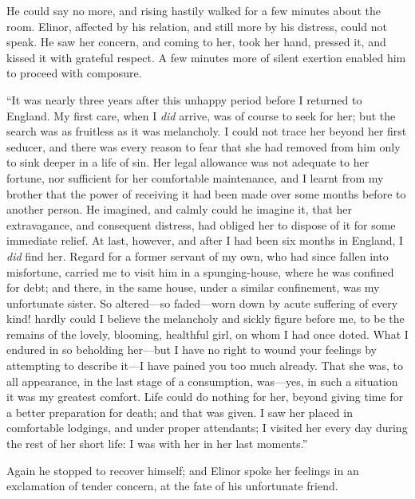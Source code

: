 He could say no more, and rising hastily walked for a few minutes about the room. Elinor, affected by his relation, and still more by his distress, could not speak. He saw her concern, and coming to her, took her hand, pressed it, and kissed it with grateful respect. A few minutes more of silent exertion enabled him to proceed with composure.

“It was nearly three years after this unhappy period before I returned to England. My first care, when I {\em did} arrive, was of course to seek for her; but the search was as fruitless as it was melancholy. I could not trace her beyond her first seducer, and there was every reason to fear that she had removed from him only to sink deeper in a life of sin. Her legal allowance was not adequate to her fortune, nor sufficient for her comfortable maintenance, and I learnt from my brother that the power of receiving it had been made over some months before to another person. He imagined, and calmly could he imagine it, that her extravagance, and consequent distress, had obliged her to dispose of it for some immediate relief. At last, however, and after I had been six months in England, I {\em did} find her. Regard for a former servant of my own, who had since fallen into misfortune, carried me to visit him in a spunging-house, where he was confined for debt; and there, in the same house, under a similar confinement, was my unfortunate sister. So altered---so faded---worn down by acute suffering of every kind! hardly could I believe the melancholy and sickly figure before me, to be the remains of the lovely, blooming, healthful girl, on whom I had once doted. What I endured in so beholding her---but I have no right to wound your feelings by attempting to describe it---I have pained you too much already. That she was, to all appearance, in the last stage of a consumption, was---yes, in such a situation it was my greatest comfort. Life could do nothing for her, beyond giving time for a better preparation for death; and that was given. I saw her placed in comfortable lodgings, and under proper attendants; I visited her every day during the rest of her short life: I was with her in her last moments.”

Again he stopped to recover himself; and Elinor spoke her feelings in an exclamation of tender concern, at the fate of his unfortunate friend.

